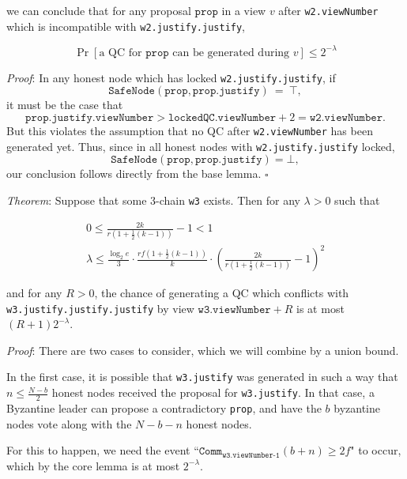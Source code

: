 \documentclass[11pt, oneside]{article}       %
\begin{document}
we can conclude that for any proposal \(\texttt{prop}\) in a view \(v\) after
\texttt{w2.viewNumber} which is incompatible with
\texttt{w2.justify.justify},

\[
    \Pr[\text{a QC for \(\texttt{prop}\) can be generated during \(v\)}] \leq 2^{-\lambda}
\]

\emph{Proof}: In any honest node which has locked
\texttt{w2.justify.justify}, if
\[\texttt{SafeNode}(\texttt{prop},\texttt{prop.justify})~=~\top,\] it must
be the case that \[\texttt{prop.justify.viewNumber} >
\texttt{lockedQC.viewNumber}+2 = \texttt{w2.viewNumber}.\] But this violates the assumption that
no QC after \texttt{w2.viewNumber} has been generated yet. Thus, since in all
honest nodes with \texttt{w2.justify.justify} locked,
\[\texttt{SafeNode}(\texttt{prop},\texttt{prop.justify}) = \bot,\] our
conclusion follows directly from the base lemma. \(\square\)

\emph{Theorem}: Suppose that some 3-chain \texttt{w3} exists. Then for any
\(\lambda > 0\) such that

\begin{equation}\label{lemma_majority}
    \begin{array}{c}
        0 \leq \frac{2k}{r\left(1+\frac{1}{2}(k-1)\right)} - 1 < 1 \\
        \lambda \leq \frac{\log_2 e
        }{3}\cdot\frac{rf\left(1+\frac{1}{2}(k-1)\right)}{k}\cdot
        {\left(\frac{2k}{r\left(1+\frac{1}{2}(k-1)\right)} - 1\right)}^2
    \end{array}
\end{equation}

and for any \(R > 0\), the chance of generating a QC which conflicts with
\texttt{w3.justify.justify.justify} by view \(\texttt{w3.viewNumber} + R\)
is at most \((R + 1)2^{-\lambda}\).

\emph{Proof}: There are two cases to consider, which we will combine by a
union bound.

In the first case, it is possible that \texttt{w3.justify} was generated in
such a way that \(n \leq \frac{N-b}{2}\) honest nodes received the proposal
for \texttt{w3.justify}. In that case, a Byzantine leader can propose a
contradictory \texttt{prop}, and have the \(b\) byzantine nodes vote along
with the \(N-b - n\) honest nodes.

For this to happen, we need the event
``\(\texttt{Comm}_{\texttt{w3.viewNumber-1}}(b + n) \geq
2f\)" to occur, which by the core lemma is at most \(2^{-\lambda}\).
\end{document}
